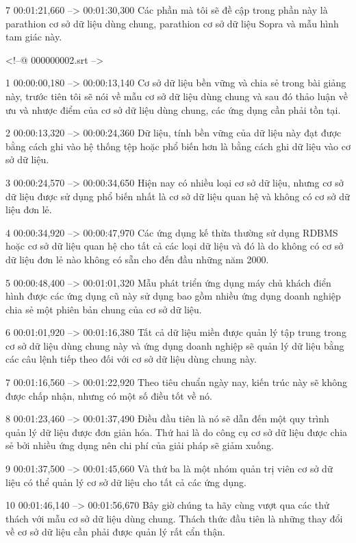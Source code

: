 7
00:01:21,660 --> 00:01:30,300
Các phần mà tôi sẽ đề cập trong phần này là parathion cơ sở dữ liệu dùng chung, parathion cơ sở dữ liệu Sopra và mẫu hình tam giác này.

<!--@ 000000002.srt -->

1
00:00:00,180 --> 00:00:13,140
Cơ sở dữ liệu bền vững và chia sẻ trong bài giảng này, trước tiên tôi sẽ nói về mẫu cơ sở dữ liệu dùng chung và sau đó thảo luận về ưu và nhược điểm của cơ sở dữ liệu dùng chung, các ứng dụng cần phải tồn tại.

2
00:00:13,320 --> 00:00:24,360
Dữ liệu, tính bền vững của dữ liệu này đạt được bằng cách ghi vào hệ thống tệp hoặc phổ biến hơn là bằng cách ghi dữ liệu vào cơ sở dữ liệu.

3
00:00:24,570 --> 00:00:34,650
Hiện nay có nhiều loại cơ sở dữ liệu, nhưng cơ sở dữ liệu được sử dụng phổ biến nhất là cơ sở dữ liệu quan hệ và không có cơ sở dữ liệu đơn lẻ.

4
00:00:34,920 --> 00:00:47,970
Các ứng dụng kế thừa thường sử dụng RDBMS hoặc cơ sở dữ liệu quan hệ cho tất cả các loại dữ liệu và đó là do không có cơ sở dữ liệu đơn lẻ nào không có sẵn cho đến đầu những năm 2000.

5
00:00:48,400 --> 00:01:01,320
Mẫu phát triển ứng dụng máy chủ khách điển hình được các ứng dụng cũ này sử dụng bao gồm nhiều ứng dụng doanh nghiệp chia sẻ một phiên bản chung của cơ sở dữ liệu.

6
00:01:01,920 --> 00:01:16,380
Tất cả dữ liệu miền được quản lý tập trung trong cơ sở dữ liệu dùng chung này và ứng dụng doanh nghiệp sẽ quản lý dữ liệu bằng các câu lệnh tiếp theo đối với cơ sở dữ liệu dùng chung này.

7
00:01:16,560 --> 00:01:22,920
Theo tiêu chuẩn ngày nay, kiến ​​trúc này sẽ không được chấp nhận, nhưng có một số điều tốt về nó.

8
00:01:23,460 --> 00:01:37,490
Điều đầu tiên là nó sẽ dẫn đến một quy trình quản lý dữ liệu được đơn giản hóa.  Thứ hai là do công cụ cơ sở dữ liệu được chia sẻ bởi nhiều ứng dụng nên chi phí của giải pháp sẽ giảm xuống.

9
00:01:37,500 --> 00:01:45,660
Và thứ ba là một nhóm quản trị viên cơ sở dữ liệu có thể quản lý cơ sở dữ liệu cho tất cả các ứng dụng.

10
00:01:46,140 --> 00:01:56,670
Bây giờ chúng ta hãy cùng vượt qua các thử thách với mẫu cơ sở dữ liệu dùng chung.  Thách thức đầu tiên là những thay đổi về cơ sở dữ liệu cần phải được quản lý rất cẩn thận.

